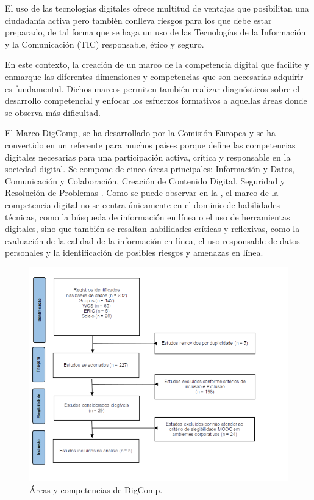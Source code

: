 \documentclass[spanish]{textolivre}
\begin{document}
El uso de las tecnologías digitales ofrece multitud de ventajas que posibilitan una ciudadanía activa pero también conlleva riesgos para los que debe estar preparado, de tal forma que se haga un uso de las Tecnologías de la Información y la Comunicación (TIC) responsable, ético y seguro.

En este contexto, la creación de un marco de la competencia digital que facilite y enmarque las diferentes dimensiones y competencias que son necesarias adquirir es fundamental. Dichos marcos permiten también realizar diagnósticos sobre el desarrollo competencial y enfocar los esfuerzos formativos a aquellas áreas donde se observa más dificultad.

El Marco DigComp, se ha desarrollado por la Comisión Europea y se ha convertido en un referente para muchos países porque define las competencias digitales necesarias para una participación activa, crítica y responsable en la sociedad digital. Se compone de cinco áreas principales: Información y Datos, Comunicación y Colaboración, Creación de Contenido Digital, Seguridad y Resolución de Problemas \cite{cabero2023nativos}. Como se puede observar en la , el marco de la competencia digital no se centra únicamente en el dominio de habilidades técnicas, como la búsqueda de información en línea o el uso de herramientas digitales, sino que también se resaltan habilidades críticas y reflexivas, como la evaluación de la calidad de la información en línea, el uso responsable de datos personales y la identificación de posibles riesgos y amenazas en línea.

\begin{figure}[h!]
\centering
\begin{minipage}{0.75\textwidth}
\includegraphics[width=\textwidth]{Fig1.png}
\caption{Áreas y competencias de DigComp.}
\label{fig1}
\end{minipage}
\end{figure}
\end{document}
